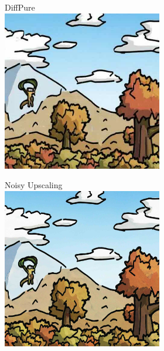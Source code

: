 \documentclass{article}
\begin{document}
\begin{figure}[h]
\begin{subfigure}[t]{\textwidth}
\begin{subfigure}[b]{0.24\textwidth}
     \end{subfigure}
     \hfill
     \begin{subfigure}[b]{0.24\textwidth}
         \centering
         DiffPure\vspace{0.3em}
         \includegraphics[width=\textwidth]{plots/process/preprocess/glaze/diffpure.jpg}
     \end{subfigure}
     \hfill
     \begin{subfigure}[b]{0.24\textwidth}
         \centering
         Noisy Upscaling\vspace{0.3em}
         \includegraphics[width=\textwidth]{plots/process/preprocess/glaze/upscale.jpg}

\end{subfigure}
\end{subfigure}
\end{figure}
\end{document}
